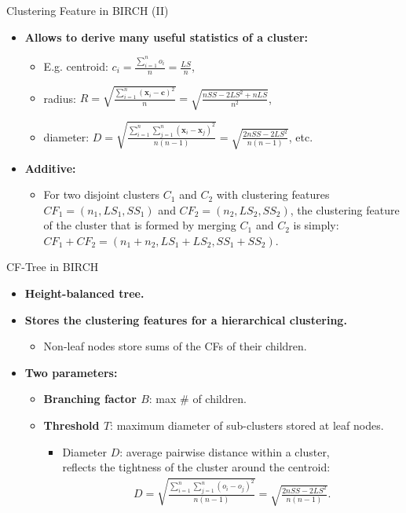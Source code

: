 \begin{frame}{Clustering Feature in BIRCH (II)}
	\begin{itemize}
		\item \textbf{Allows to derive many useful statistics of a cluster:}
		\begin{itemize}
			\item E.g. centroid: $c_i = \frac{\sum_{i=1}^{n}o_i}{n} = 
			\frac{LS}{n}$,
			\item radius: $R = 
			\sqrt{\frac{\sum_{i=1}^{n}(\mathbf{x}_i-\mathbf{c})^2}{n}} = 
			\sqrt{\frac{nSS-2LS^2+nLS}{n^2}}$,
			\item diameter: $D = 
			\sqrt{\frac{\sum_{i=1}^{n}\sum_{j=1}^{n}(\mathbf{x}_i-\mathbf{x}_j)^2}{n(n-1)}}
			 = \sqrt{\frac{2nSS-2LS^2}{n(n-1)}}$, etc.
		\end{itemize}
		\item \textbf{Additive:}
		\begin{itemize}
			\item For two disjoint clusters $C_1$ and $C_2$ with clustering 
			features $CF_1 = (n_1, LS_1, SS_1)$ and $CF_2 = (n_2, LS_2, SS_2)$, 
			the clustering feature of the cluster that is formed by merging 
			$C_1$ and $C_2$ is simply: $CF_1 + CF_2 = (n_1 + n_2, LS_1 + LS_2, 
			SS_1 + SS_2)$.
		\end{itemize}
	\end{itemize}
\end{frame}

\begin{frame}{CF-Tree in BIRCH}
	\begin{itemize}
		\item \textbf{Height-balanced tree.}
		\item \textbf{Stores the clustering features for a hierarchical 
		clustering.}
		\begin{itemize}
			\item Non-leaf nodes store sums of the CFs of their children.
		\end{itemize}
		\item \textbf{Two parameters:}
		\begin{itemize}
			\item \textbf{\color{airforceblue}Branching factor $B$}: max \# of 
			children.
			\item \textbf{\color{airforceblue}Threshold $T$}: maximum diameter 
			of sub-clusters stored at leaf nodes.
			\begin{itemize}
				\item Diameter $D$: average pairwise distance within a cluster, 
				\\
				reflects the tightness of the cluster around the centroid:
				\begin{align}
					D = \sqrt{\frac{\sum_{i=1}^{n} \sum_{j=1}^{n} 
					(o_i-o_j)^2}{n(n-1)}} = \sqrt{\frac{2nSS - 2LS^2}{n(n-1)}}. 
				\end{align}
			\end{itemize}
		\end{itemize}
	\end{itemize}
\end{frame}

